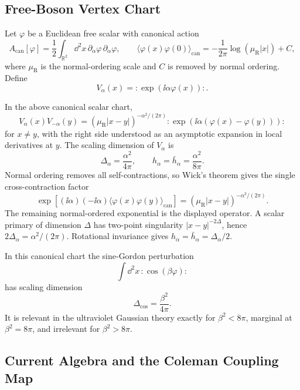 \subsection{Free-Boson Vertex Chart}

Let \(\varphi\) be a Euclidean free scalar with canonical action
\[
  A_{\mathrm{can}}[\varphi]
  =
  \frac12\int_{\mathbb R^2}\dd^2x\,
  \partial_\alpha\varphi\,\partial_\alpha\varphi ,
  \qquad
  \langle\varphi(x)\varphi(0)\rangle_{\mathrm{can}}
  =
  -\frac{1}{2\pi}\log(\mu_{\mathrm R}|x|)+C ,
\]
where \(\mu_{\mathrm R}\) is the normal-ordering scale and \(C\) is removed
by normal ordering.  Define
\[
  V_\alpha(x)=:\!\exp(\ii\alpha\varphi(x))\!: .
\]

In the above canonical scalar chart,
\begin{equation}
  V_\alpha(x)V_{-\alpha}(y)
  =
  (\mu_{\mathrm R}|x-y|)^{-\alpha^2/(2\pi)}
  :\!\exp(\ii\alpha(\varphi(x)-\varphi(y)))\!:
  \label{eq:sg-thirring-vertex-ope}
\end{equation}
for \(x\ne y\), with the right side understood as an asymptotic expansion in
local derivatives at \(y\).  The scaling dimension of \(V_\alpha\) is
\begin{equation}
  \Delta_\alpha=\frac{\alpha^2}{4\pi},
  \qquad
  h_\alpha=\bar h_\alpha=\frac{\alpha^2}{8\pi}.
  \label{eq:sg-thirring-vertex-dimension}
\end{equation}
Normal ordering removes all self-contractions, so Wick's theorem gives the
single cross-contraction factor
\[
  \exp\!\left[
    (\ii\alpha)(-\ii\alpha)
    \langle\varphi(x)\varphi(y)\rangle_{\mathrm{can}}
  \right]
  =
  (\mu_{\mathrm R}|x-y|)^{-\alpha^2/(2\pi)} .
\]
The remaining normal-ordered exponential is the displayed operator.  A scalar
primary of dimension \(\Delta\) has two-point singularity
\(|x-y|^{-2\Delta}\), hence
\(2\Delta_\alpha=\alpha^2/(2\pi)\).  Rotational invariance gives
\(h_\alpha=\bar h_\alpha=\Delta_\alpha/2\).

In this canonical chart the sine-Gordon perturbation
\[
  \int\dd^2x\,:\!\cos(\beta\varphi)\!:
\]
has scaling dimension
\[
  \Delta_{\cos}=\frac{\beta^2}{4\pi}.
\]
It is relevant in the ultraviolet Gaussian theory exactly for
\(\beta^2<8\pi\), marginal at \(\beta^2=8\pi\), and irrelevant for
\(\beta^2>8\pi\).

\subsection{Current Algebra and the Coleman Coupling Map}

